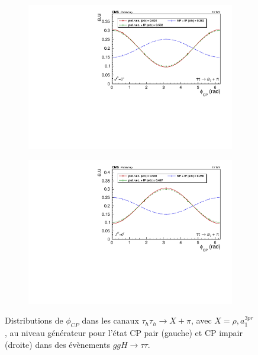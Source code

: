 \begin{figure}[]
  \begin{subfigure}[b]{0.5\linewidth}
    \centering
    \includegraphics[width=\linewidth]{Chapitre6/Images/A1PION/A1PION_even_gen.pdf} 
    \caption*{} 
    \vspace{0.5ex}
  \end{subfigure}%
  \begin{subfigure}[b]{0.5\linewidth}
    \centering
    \includegraphics[width=\linewidth]{Chapitre6/Images/A1PION/A1PION_odd_gen.pdf} 
    \caption*{} 
    \vspace{0.5ex}
  \end{subfigure} 
  \caption{Distributions de $\phi_{CP}$ dans les canaux $\tau_h\tau_h\rightarrow X+\pi$, avec $X=\rho,a^{3pr}_1$, au niveau générateur pour l'état CP pair (gauche) et CP impair (droite) dans des évènements $ggH\to\tau\tau$.}
  \label{CPgenXPI}
\end{figure}


